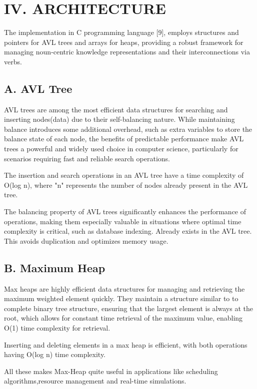 \documentclass[conference]{IEEEtran}
\begin{document}
\section*{IV. ARCHITECTURE}

The implementation in C programming language [9], employs structures and pointers for AVL trees and arrays for heaps, providing a robust framework for managing noun-centric knowledge representations and their interconnections via verbs.

\subsection*{A. AVL Tree}

AVL trees are among the most efficient data structures for searching and inserting nodes(data) due to their 
self-balancing nature. While maintaining balance introduces some additional overhead, such as extra
variables to store the balance state of each node, the 
benefits of predictable performance make AVL trees a powerful and widely used choice in computer 
science, particularly for scenarios requiring fast and reliable search operations.

The insertion and search operations in an AVL tree have a time complexity of O(log n), 
where "n" represents the number of nodes already present in the AVL tree.


The balancing property of AVL trees significantly enhances the performance of operations, 
making them especially valuable in situations where optimal time complexity is critical, such as 
database indexing. Already exists in the AVL tree. This avoids duplication and optimizes memory usage.

\subsection*{B. Maximum Heap}

Max heaps are highly efficient data structures for managing and retrieving the maximum weighted element 
quickly. 
They maintain a structure similar to to complete binary tree structure, ensuring that the largest 
element is always at the  root, which allows for constant time retrieval of the maximum value, 
enabling O(1) time complexity for retrieval.

Inserting and deleting elements in a max heap is efficient, with both operations having O(log n) 
   time complexity.

All these makes Max-Heap quite useful in applications like scheduling algorithms,resource management 
and real-time simulations.
\end{document}
